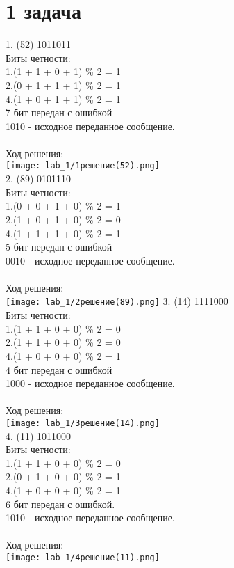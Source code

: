 \documentclass[a4paper]{article}
\begin{document}
\section{1 задача}
1. (52)  1011011 \\
   Биты четности:\\
   1.(1 + 1 + 0 + 1) \% 2 = 1\\
   2.(0 + 1 + 1 + 1) \% 2 = 1\\
   4.(1 + 0 + 1 + 1) \% 2 = 1\\
   7 бит передан с ошибкой \\
   1010 - исходное переданное сообщение. \\ 
\\
Ход решения:
\\
\texttt{[image: lab\_1/1решение(52).png]}
\\
2. (89) 0101110 \\
   Биты четности: \\
   1.(0 + 0 + 1 + 0) \% 2 = 1\\
   2.(1 + 0 + 1 + 0) \% 2 = 0\\
   4.(1 + 1 + 1 + 0) \% 2 = 1\\
   5 бит передан с ошибкой \\
   0010 - исходное переданное сообщение. \\
\\
Ход решения:
\\
\texttt{[image: lab\_1/2решение(89).png]}
3. (14) 1111000\\
   Биты четности: \\
   1.(1 + 1 + 0 + 0) \% 2 = 0\\
   2.(1 + 1 + 0 + 0) \% 2 = 0\\
   4.(1 + 0 + 0 + 0) \% 2 = 1\\
   4 бит передан с ошибкой \\
  1000 - исходное переданное сообщение. \\
\\
Ход решения:
\\
\texttt{[image: lab\_1/3решение(14).png]}
\\
4. (11) 1011000\\
   Биты четности: \\
   1.(1 + 1 + 0 + 0) \% 2 = 0\\
   2.(0 + 1 + 0 + 0) \% 2 = 1\\
   4.(1 + 0 + 0 + 0) \% 2 = 1\\
   6 бит передан с ошибкой. \\
   1010 - исходное переданное сообщение. \\
\\
Ход решения:
\\
\texttt{[image: lab\_1/4решение(11).png]}
\\
\newpage
\end{document}
